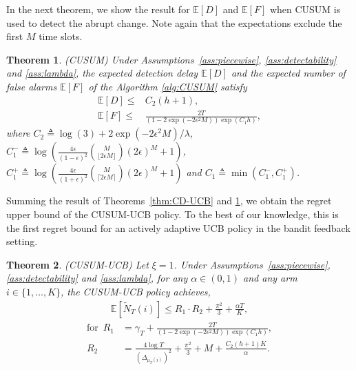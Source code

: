 \documentclass[letterpaper]{article}
\newtheorem{theorem}{Theorem}
\begin{document}
In the next theorem, we show the result for $\mathbb{E}[D]$ and
$\mathbb{E}[F]$ when CUSUM is used to detect the abrupt change. Note
again that the expectations exclude the first $M$ time slots.
\begin{theorem}\label{thm:CUSUM}
\emph{(CUSUM)} Under Assumptions~\ref{ass:piecewise}, \ref{ass:detectability} and \ref{ass:lambda}, the expected detection delay $\mathbb{E}[D]$ and the expected number of false alarms $\mathbb{E}[F]$ of the Algorithm \ref{alg:CUSUM} satisfy
\begin{align}
\mathbb{E}[D]\leq&{C_2(h+1)},\\
\mathbb{E}[F]\leq&\frac{2T}{(1-2\exp(-2\epsilon^2M))\exp(C_1h)},
\end{align}
where $C_2\triangleq\log(3)+2\exp(-2\epsilon^2M)/\lambda$, $C_1^-\triangleq\log\left(\frac{4\epsilon}{(1-\epsilon)^2}\binom{M}{\lfloor 2\epsilon M\rfloor}(2\epsilon)^M+1\right)$, $C_1^+\triangleq\log\left(\frac{4\epsilon}{(1+\epsilon)^2}\binom{M}{\lceil 2\epsilon M\rceil}(2\epsilon)^M+1\right)$ and $C_1\triangleq\min(C_1^-,C_1^+)$.
\end{theorem}

Summing the result of Theorems~\ref{thm:CD-UCB} and \ref{thm:CUSUM}, we obtain the regret upper bound of the CUSUM-UCB policy. To the best of our knowledge, this is the first regret bound for an actively adaptive UCB policy in the bandit feedback setting.
\begin{theorem}\label{thm:CUSUM-UCB}
\emph{(CUSUM-UCB)} Let $\xi=1$.  Under
Assumptions~\ref{ass:piecewise}, \ref{ass:detectability} and
\ref{ass:lambda}, for any $\alpha\in(0,1)$ and any arm
$i\in\{1,\ldots,K\}$, the CUSUM-UCB policy achieves,
\begin{align}
\mathbb{E}[\tilde{N}_T(i)]\leq R_1\cdot
  R_2+\frac{\pi^2}{3}+\frac{\alpha T}{K},
\end{align}
\begin{align*}
\text{for} \,\,\, R_1&=\gamma_T+\frac{2 T}{(1-2\exp(-2\epsilon^2M))\exp(C_1h)},\\
R_2&=\frac{4\log T}{(\Delta_{\mu_T(i)})^2}+\frac{\pi^2}{3}+M+\frac{C_2(h+1)K}{\alpha}.
\end{align*}
\end{theorem}
\end{document}
